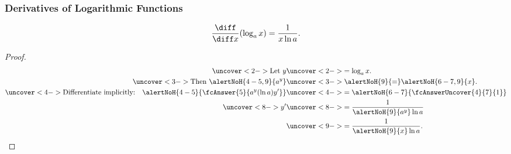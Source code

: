 \begin{frame}
\frametitle{Derivatives of Logarithmic Functions}
\begin{theorem}
\[
\frac{\diff}{\diff x} (\log_a x) = \frac{1}{x\ln a} .
\]
\end{theorem}
\begin{proof}
\abovedisplayskip=0pt
\belowdisplayskip=0pt
\abovedisplayshortskip=0pt
\belowdisplayshortskip=0pt
\begin{align*}
\uncover<2->{%
\text{Let } y %
}%
& \uncover<2->{%
 = \log_a x. %
}\\%
\uncover<3->{%
\text{Then } \alertNoH{ 4-5,9}{a^y} %
}%
& \uncover<3->{%
 \alertNoH{ 9}{=} \alertNoH{ 6-7,9}{x}. %
}\\%
\uncover<4->{%
\text{Differentiate implicitly:}\quad \alertNoH{ 4-5}{\fcAnswer{5}{a^y (\ln a) y'}} %
}%
& \uncover<4->{%
 = \alertNoH{ 6-7}{\fcAnswerUncover{4}{7}{1}} %
}\\%
\uncover<8->{%
y' %
}%
& \uncover<8->{%
 = \frac{1}{\alertNoH{ 9}{a^y}\ln a} %
}\\%
& \uncover<9->{%
 = \frac{1}{\alertNoH{ 9}{x}\ln a}. %
}%
\end{align*}
\end{proof}
\end{frame}
